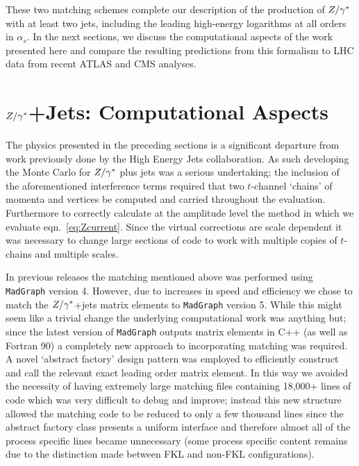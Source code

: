 	These two matching schemes complete our description of the production of $Z/\gamma^*$
	with at least two jets, including the leading high-energy logarithms at all
	orders in $\alpha_s$.  In the next sections, we discuss the computational aspects
	of the work presented here and compare the resulting predictions from this formalism
	to LHC data from recent ATLAS and CMS analyses.

\section{$Z/\gamma^*$+Jets: Computational Aspects}

	The physics presented in the preceding sections is a significant departure from
	work previously done by the High Energy Jets collaboration.  As such developing
	the Monte Carlo for $Z/\gamma^*$ plus jets was a serious undertaking; the inclusion of
	the aforementioned interference terms required that two $t$-channel `chains' of
	momenta and vertices be computed and carried throughout the evaluation.
	Furthermore to correctly calculate at the amplitude level the method in which
	we evaluate eqn.~\eqref{eq:Zcurrent}.  Since the virtual corrections are scale
	dependent it was necessary to change large sections of code to work with multiple
	copies of $t$-chains and multiple scales.

	In previous \HEJ releases the matching mentioned above was performed using
	\texttt{MadGraph} version 4.  However, due to increases in speed and efficiency
	we chose to match the $Z/\gamma^*$+jets \HEJ matrix elements to \texttt{MadGraph} version 5.
	While this might seem like a trivial change the underlying computational work
	was anything but; since the latest version of \texttt{MadGraph} outputs
	matrix elements in C++ (as well as Fortran 90) a completely new approach
	to incorporating matching was required.  A novel `abstract factory' design pattern
	was employed to efficiently construct and call the relevant exact leading order
	matrix element.  In this way we avoided the necessity of having extremely large
	matching files containing 18,000+ lines of code which was very difficult to
	debug and improve; instead this new structure allowed the matching code to
	be reduced to only a few thousand lines since the abstract factory class
	presents a uniform interface and therefore almost all of the process specific
	lines became unnecessary (some process specific content remains due to the
	distinction made between FKL and non-FKL configurations).

